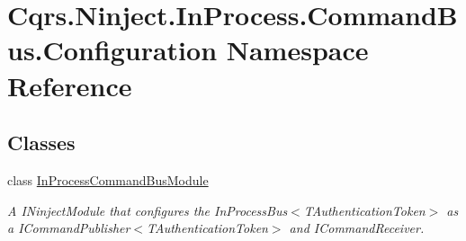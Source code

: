 \hypertarget{namespaceCqrs_1_1Ninject_1_1InProcess_1_1CommandBus_1_1Configuration}{}\section{Cqrs.\+Ninject.\+In\+Process.\+Command\+Bus.\+Configuration Namespace Reference}
\label{namespaceCqrs_1_1Ninject_1_1InProcess_1_1CommandBus_1_1Configuration}
\subsection*{Classes}
\begin{DoxyCompactItemize}
\item 
class \hyperlink{classCqrs_1_1Ninject_1_1InProcess_1_1CommandBus_1_1Configuration_1_1InProcessCommandBusModule}{In\+Process\+Command\+Bus\+Module}
\begin{DoxyCompactList}\small\item\em A I\+Ninject\+Module that configures the In\+Process\+Bus$<$\+T\+Authentication\+Token$>$ as a I\+Command\+Publisher$<$\+T\+Authentication\+Token$>$ and I\+Command\+Receiver. \end{DoxyCompactList}\end{DoxyCompactItemize}
